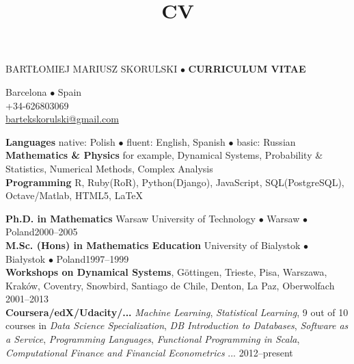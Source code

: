 \documentclass[a4paper, twoside]{scrreprt}
\title{CV}
\author{}
\date{}
\begin{document}
\noindent BARTŁOMIEJ MARIUSZ SKORULSKI $\bullet$ \textbf{CURRICULUM VITAE}
\vspace{-0.3cm}

\noindent\makebox[\linewidth]{\rule{\textwidth}{0.4pt}}

{\small
\noindent\llap{\FA \faHome\ \ } Barcelona $\bullet$ Spain\\
\noindent\llap{\FA \faMobilePhone\ \ \ }+34-626803069\\
\noindent\llap{\FA \faEnvelope\ \ }\href{mailto:bartekskorulski@gmail.com}{bartekskorulski@gmail.com}
}\\
\noindent\makebox[\linewidth]{\rule{\textwidth}{0.4pt}}

\vspace{0.1cm}


\noindent\llap{\FA \faComments\ \ }\textbf{Languages} native: Polish $\bullet$ fluent: English, Spanish $\bullet$ basic: Russian \\
\noindent\llap{\FA \faSuperscript\ \ }\textbf{Mathematics \& Physics} for example, Dynamical Systems, Probability \& Statistics, Numerical Methods, 
Complex Analysis\\
\noindent\llap{\FA \faKeyboard\ \ }\textbf{Programming} R, Ruby(RoR), Python(Django),  JavaScript, SQL(PostgreSQL), Octave/Matlab, HTML5, 
\LaTeX \\
\noindent\makebox[\linewidth]{\rule{\textwidth}{0.4pt}}

\vspace{0.1cm}
\noindent\textbf{Ph.D. in Mathematics} Warsaw University of Technology $\bullet$ Warsaw $\bullet$ Poland\hfill 2000--2005\\
\noindent\textbf{M.Sc. (Hons) in Mathematics Education} University of Bialystok $\bullet$ Białystok $\bullet$ Poland\hfill 1997--1999\\
\noindent\textbf{Workshops on Dynamical Systems}, Göttingen, Trieste, Pisa, Warszawa, Kraków, Coventry, Snowbird, Santiago de Chile, Denton, 
La Paz, Oberwolfach  \hfill 2001--2013\\
\noindent\textbf{Coursera/edX/Udacity/...} \emph{Machine Learning}, 
\emph{Statistical Learning}, 9 out of 10 courses in \emph{Data Science Specialization}, 
\emph{DB Introduction to Databases}, \emph{Software as a Service}, 
\emph{Programming Languages}, \emph{Functional Programming in Scala}, 
\emph{Computational Finance and Financial Econometrics} ... \hfill 2012--present\\
\noindent\makebox[\linewidth]{\rule{\textwidth}{0.4pt}}
\end{document}
